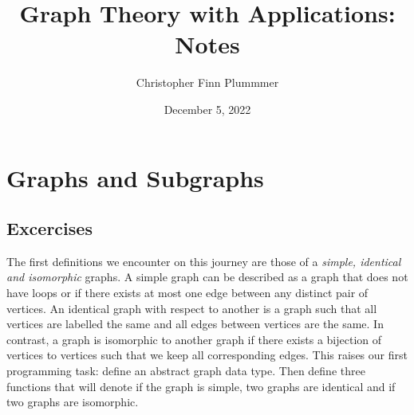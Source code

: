 \documentclass[12pt, letterpaper]{article}
\title{Graph Theory with Applications: Notes}
\author{Christopher Finn Plummmer}
\date{December 5, 2022}
\begin{document}
\maketitle

\newpage

\section{Graphs and Subgraphs}

\subsection{Excercises}

The first definitions we encounter on this journey are those of a
\textit{simple, identical and isomorphic} graphs. A simple graph can be
described as a graph that does not have loops or if there exists at most one
edge between any distinct pair of vertices. An identical graph with respect
to another is a graph such that all vertices are labelled the same and all
edges between vertices are the same. In contrast, a graph is isomorphic to
another graph if there exists a bijection of vertices to vertices such that
we keep all corresponding edges. This raises our first programming task:
define an abstract graph data type. Then define three functions that will
denote if the graph is simple, two graphs are identical and if two graphs
are isomorphic.
\end{document}
